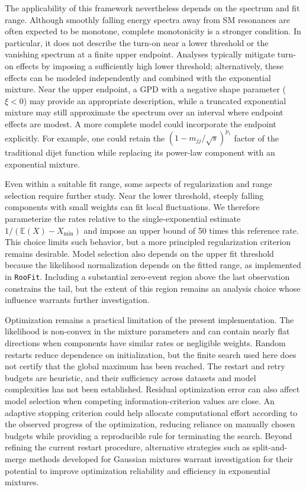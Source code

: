 \documentclass[a4paper,11pt]{article}
\begin{document}
The applicability of this framework nevertheless depends on the spectrum and fit range. Although smoothly falling energy spectra away from SM resonances are often expected to be monotone, complete monotonicity is a stronger condition. In particular, it does not describe the turn-on near a lower threshold or the vanishing spectrum at a finite upper endpoint. Analyses typically mitigate turn-on effects by imposing a sufficiently high lower threshold; alternatively, these effects can be modeled independently and combined with the exponential mixture. Near the upper endpoint, a GPD with a negative shape parameter ($\xi<0$) may provide an appropriate description, while a truncated exponential mixture may still approximate the spectrum over an interval where endpoint effects are modest. A more complete model could incorporate the endpoint explicitly. For example, one could retain the $(1-m_{jj}/\sqrt{s})^{p_1}$ factor of the traditional dijet function while replacing its power-law component with an exponential mixture.

Even within a suitable fit range, some aspects of regularization and range selection require further study. Near the lower threshold, steeply falling components with small weights can fit local fluctuations. We therefore parameterize the rates relative to the single-exponential estimate $1/(\mathbb{E}(X)-X_{\min})$ and impose an upper bound of 50 times this reference rate. This choice limits such behavior, but a more principled regularization criterion remains desirable. Model selection also depends on the upper fit threshold because the likelihood normalization depends on the fitted range, as implemented in \texttt{RooFit}. Including a substantial zero-event region above the last observation constrains the tail, but the extent of this region remains an analysis choice whose influence warrants further investigation.

Optimization remains a practical limitation of the present implementation. The likelihood is non-convex in the mixture parameters and can contain nearly flat directions when components have similar rates or negligible weights. Random restarts reduce dependence on initialization, but the finite search used here does not certify that the global maximum has been reached. The restart and retry budgets are heuristic, and their sufficiency across datasets and model complexities has not been established. Residual optimization error can also affect model selection when competing information-criterion values are close. An adaptive stopping criterion could help allocate computational effort according to the observed progress of the optimization, reducing reliance on manually chosen budgets while providing a reproducible rule for terminating the search. Beyond refining the current restart procedure, alternative strategies such as split-and-merge methods developed for Gaussian mixtures \cite{split-and-merge} warrant investigation for their potential to improve optimization reliability and efficiency in exponential mixtures.
\end{document}
